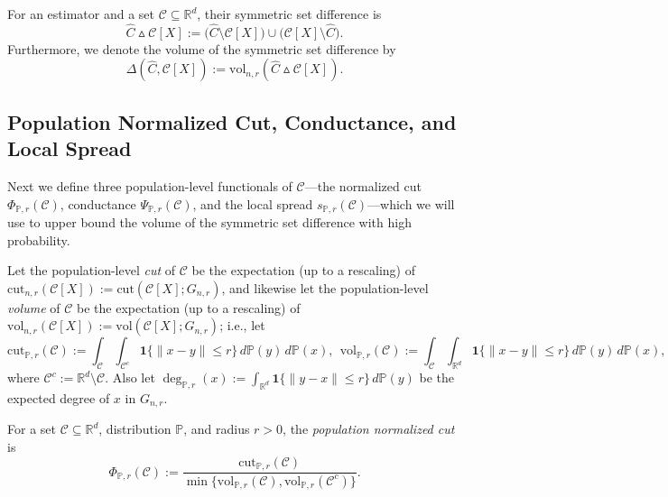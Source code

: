 \documentclass[twoside,11pt]{article}
\newcommand{\Reals}{\mathbb{R}}
\newcommand{\1}{\mathbf{1}}
\newcommand{\Rd}{\Reals^d}
\newcommand{\mc}[1]{\mathcal{#1}}
\newcommand{\Pbb}{\mathbb{P}}
\newcommand{\wh}[1]{\widehat{#1}}
\newcommand{\vol}{\mathrm{vol}}
\newcommand{\cut}{\mathrm{cut}}
\begin{document}
\begin{definition}
	\label{def:volume_symmetric_set_difference}
	For an estimator \smash{$\wh{C} \subseteq X$} and a set $\mc{C} \subseteq \Rd$, their symmetric set difference is  
	\begin{equation*}
	\wh{C} \vartriangle \mc{C}[X] :=
	\bigl(\wh{C} \setminus \mc{C}[X]\bigr) \cup
	\bigl(\mc{C}[X] \setminus \wh{C}\bigr).
	\end{equation*}
	Furthermore, we denote the volume of the symmetric set difference by 
	$$
	\Delta(\wh{C}, \mc{C}[X]) := \vol_{n,r}(\wh{C} \vartriangle \mc{C}[X]). 
	$$
\end{definition}

\subsection{Population Normalized Cut, Conductance, and Local Spread}
Next we define three population-level functionals of $\mc{C}$---the normalized cut $\Phi_{\Pbb,r}(\mc{C})$, conductance $\Psi_{\Pbb,r}(\mc{C})$, and the local spread $s_{\Pbb,r}(\mc{C})$---which we will use to upper bound the volume of the symmetric set difference \smash{$\Delta(\wh{C},\mc{C}[X])$} with high probability.

Let the population-level \emph{cut} of $\mc{C}$ be the expectation (up to a rescaling) of $\cut_{n,r}(\mc{C}[X]) := \cut(\mc{C}[X]; G_{n,r})$,  and likewise let the population-level \emph{volume} of $\mc{C}$ be the expectation (up to a rescaling) of $\vol_{n,r}(\mc{C}[X]) := \vol(\mc{C}[X]; G_{n,r})$; i.e., let
\begin{equation*}
\mathrm{cut}_{\Pbb,r}(\mc{C}) := \int_{\mc{C}} \int_{\mc{C}^c} \1\{\|x - y\| \leq r\} \,d\Pbb(y) \,d\Pbb(x),~~ \mathrm{vol}_{\Pbb,r}(\mc{C}) := \int_{\mc{C}} \int_{\Rd} \1\{\|x - y\| \leq r\} \,d\Pbb(y) \,d\Pbb(x),
\end{equation*}
where $\mc{C}^c := \Rd \!\setminus\! \mc{C}$. Also let $\deg_{\Pbb,r}(x) := \int_{\Rd} \1\{\|y - x\| \leq r\} \,d\Pbb(y)$ be the expected degree of $x$ in $G_{n,r}$. 
\begin{definition}
	For a set $\mc{C} \subseteq \Rd$, distribution $\Pbb$, and radius $r > 0$, the \emph{population normalized cut} is
	\begin{equation}
	\label{eqn:population_normalized_cut}
	\Phi_{\Pbb,r}(\mc{C}) := \frac{\mathrm{cut}_{\Pbb,r}(\mc{C})}{\min\{\mathrm{vol}_{\Pbb,r}(\mc{C}), \mathrm{vol}_{\Pbb,r}(\mc{C}^c)\}}.
	\end{equation}
\end{definition}
\end{document}

